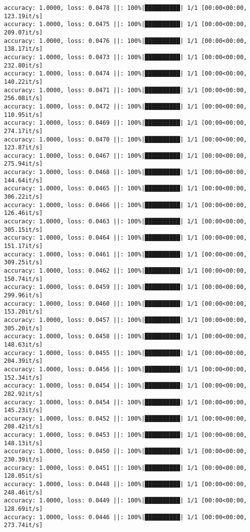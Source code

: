 \documentclass[
]{article}
\begin{document}
\begin{verbatim}
accuracy: 1.0000, loss: 0.0478 ||: 100%|██████████| 1/1 [00:00<00:00, 123.19it/s]
accuracy: 1.0000, loss: 0.0475 ||: 100%|██████████| 1/1 [00:00<00:00, 209.07it/s]
accuracy: 1.0000, loss: 0.0476 ||: 100%|██████████| 1/1 [00:00<00:00, 138.17it/s]
accuracy: 1.0000, loss: 0.0473 ||: 100%|██████████| 1/1 [00:00<00:00, 232.80it/s]
accuracy: 1.0000, loss: 0.0474 ||: 100%|██████████| 1/1 [00:00<00:00, 140.22it/s]
accuracy: 1.0000, loss: 0.0471 ||: 100%|██████████| 1/1 [00:00<00:00, 256.08it/s]
accuracy: 1.0000, loss: 0.0472 ||: 100%|██████████| 1/1 [00:00<00:00, 110.95it/s]
accuracy: 1.0000, loss: 0.0469 ||: 100%|██████████| 1/1 [00:00<00:00, 274.17it/s]
accuracy: 1.0000, loss: 0.0470 ||: 100%|██████████| 1/1 [00:00<00:00, 123.87it/s]
accuracy: 1.0000, loss: 0.0467 ||: 100%|██████████| 1/1 [00:00<00:00, 275.94it/s]
accuracy: 1.0000, loss: 0.0468 ||: 100%|██████████| 1/1 [00:00<00:00, 144.64it/s]
accuracy: 1.0000, loss: 0.0465 ||: 100%|██████████| 1/1 [00:00<00:00, 306.22it/s]
accuracy: 1.0000, loss: 0.0466 ||: 100%|██████████| 1/1 [00:00<00:00, 126.46it/s]
accuracy: 1.0000, loss: 0.0463 ||: 100%|██████████| 1/1 [00:00<00:00, 305.15it/s]
accuracy: 1.0000, loss: 0.0464 ||: 100%|██████████| 1/1 [00:00<00:00, 151.17it/s]
accuracy: 1.0000, loss: 0.0461 ||: 100%|██████████| 1/1 [00:00<00:00, 309.25it/s]
accuracy: 1.0000, loss: 0.0462 ||: 100%|██████████| 1/1 [00:00<00:00, 150.74it/s]
accuracy: 1.0000, loss: 0.0459 ||: 100%|██████████| 1/1 [00:00<00:00, 299.96it/s]
accuracy: 1.0000, loss: 0.0460 ||: 100%|██████████| 1/1 [00:00<00:00, 153.20it/s]
accuracy: 1.0000, loss: 0.0457 ||: 100%|██████████| 1/1 [00:00<00:00, 305.20it/s]
accuracy: 1.0000, loss: 0.0458 ||: 100%|██████████| 1/1 [00:00<00:00, 148.63it/s]
accuracy: 1.0000, loss: 0.0455 ||: 100%|██████████| 1/1 [00:00<00:00, 204.39it/s]
accuracy: 1.0000, loss: 0.0456 ||: 100%|██████████| 1/1 [00:00<00:00, 152.34it/s]
accuracy: 1.0000, loss: 0.0454 ||: 100%|██████████| 1/1 [00:00<00:00, 282.92it/s]
accuracy: 1.0000, loss: 0.0454 ||: 100%|██████████| 1/1 [00:00<00:00, 145.23it/s]
accuracy: 1.0000, loss: 0.0452 ||: 100%|██████████| 1/1 [00:00<00:00, 208.42it/s]
accuracy: 1.0000, loss: 0.0453 ||: 100%|██████████| 1/1 [00:00<00:00, 148.13it/s]
accuracy: 1.0000, loss: 0.0450 ||: 100%|██████████| 1/1 [00:00<00:00, 230.39it/s]
accuracy: 1.0000, loss: 0.0451 ||: 100%|██████████| 1/1 [00:00<00:00, 128.05it/s]
accuracy: 1.0000, loss: 0.0448 ||: 100%|██████████| 1/1 [00:00<00:00, 248.46it/s]
accuracy: 1.0000, loss: 0.0449 ||: 100%|██████████| 1/1 [00:00<00:00, 128.69it/s]
accuracy: 1.0000, loss: 0.0446 ||: 100%|██████████| 1/1 [00:00<00:00, 273.74it/s]

\end{verbatim}
\end{document}
